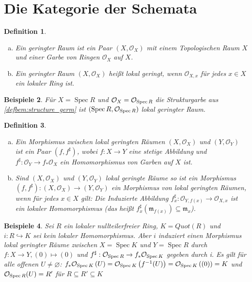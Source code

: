 \documentclass[a4paper,oneside]{scrbook}
\theoremstyle{break}
\newtheorem{Def}{Definition}[section]
\newtheorem{Bsp}[Def]{Beispiele}
\theoremstyle{nonumberbreak}
\theoremstyle{nonumberplain}
\theoremstyle{break}
\renewcommand{\emptyset}{%
	\ensuremath{\varnothing}%
}
\newcommand{\Spec}{%
	\ensuremath{\operatorname{Spec}}%
}
\begin{document}
\section{Die Kategorie der Schemata}

\begin{Def}
	\begin{enumerate}[(a)]
		\item Ein \emph{geringter Raum} ist ein Paar $\left( X, \mathcal{O}_X \right)$ mit einem Topologischen Raum $X$ und einer Garbe von Ringen $\mathcal{O}_X$ auf $X$.
		\item Ein geringter Raum $\left( X, \mathcal{O}_X \right)$ heißt \emph{lokal geringt}, wenn $\mathcal{O}_{X,x}$ für jedes $x \in X$ ein lokaler Ring ist.
	\end{enumerate}
\end{Def}

\begin{Bsp}
 Für $X=\Spec R$ und $\mathcal{O}_X =\mathcal{O}_{\Spec R}$ die Strukturgarbe aus \ref{defbem:structure_germ} ist $\left( \Spec R,\mathcal{O}_{\Spec R} \right)$ lokal geringter Raum.
\end{Bsp}

\begin{Def}
	\begin{enumerate}[(a)]
		\item Ein Morphismus zwischen lokal geringten Räumen $\left( X, \mathcal{O}_X \right)$ und $\left( Y, \mathcal{O}_Y \right)$ ist ein Paar $\left( f, f^\sharp \right)$, wobei $f : X \rightarrow Y$ eine stetige Abbildung und $f^\sharp: \mathcal{O}_Y \rightarrow f_* \mathcal{O}_X$ ein Homomorphismus von Garben auf $X$ ist.
		\item Sind $\left( X, \mathcal{O}_X \right)$ und $\left( Y, \mathcal{O}_Y \right)$ lokal geringte Räume so ist ein Morphismus $\left( f, f^\sharp \right) :\left( X, \mathcal{O}_X \right) \rightarrow \left( Y, \mathcal{O}_Y \right) $ ein Morphismus von lokal geringten Räumen, wenn für jedes $x \in X$ gilt: Die Induzierte Abbildung $f^\sharp_x: \mathcal{O}_{Y,f(x)} \rightarrow  \mathcal{O}_{X,x}$ ist ein lokaler Homomorphismus (das heißt $f^\sharp_x \left( \mathfrak{m}_{f(x)}\right) \subseteq \mathfrak{m}_x$).
	\end{enumerate}
\end{Def}

\begin{Bsp}
	Sei $R$ ein lokaler nullteilerfreier Ring, $K=Quot(R)$ und $i: R \hookrightarrow K$ sei kein lokaler Homomorphismus. Aber $i$ induziert einen Morphismus lokal geringter Räume zwischen $X=\Spec K$ und $Y= \Spec R$ durch $f: X \rightarrow Y, (0) \mapsto (0)$ und $f^\sharp:\mathcal{O}_{\Spec R} \rightarrow f_* \mathcal{O}_{\Spec K} $ gegeben durch i. Es gilt für alle offenen $U \neq \emptyset$: $f_* \mathcal{O}_{\Spec K} \left( U \right) = \mathcal{O}_{\Spec K} \left( f^{-1}(U) \right) = \mathcal{O}_{\Spec K} \left( (0) \right) = K$ und $\mathcal{O}_{\Spec R}(U)=R'$ für $R \subseteq R' \subseteq K$
\end{Bsp}
\end{document}

